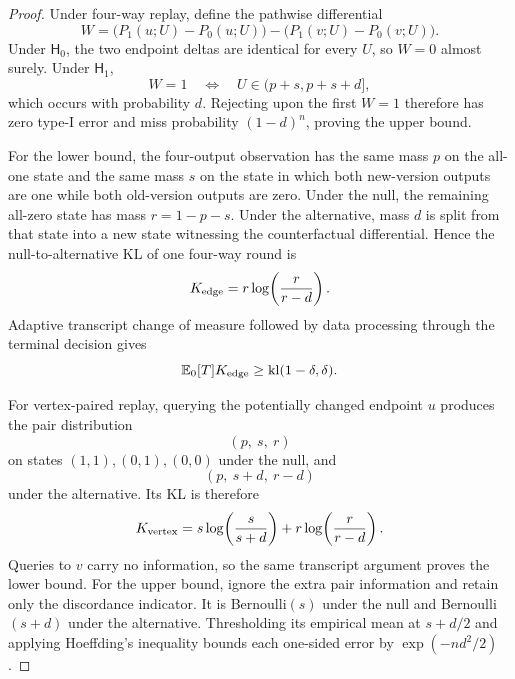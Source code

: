 \begin{proof}
Under four-way replay, define the pathwise differential
\begin{equation}\label{eq:formal-results-024}
W
=
\bigl(P_1(u;U)-P_0(u;U)\bigr)
-
\bigl(P_1(v;U)-P_0(v;U)\bigr).
\end{equation}
Under \(\mathsf H_0\), the two endpoint deltas are identical for every \(U\), so
\(W=0\) almost surely.  Under \(\mathsf H_1\),
\begin{equation}\label{eq:formal-results-025}
W=1
\quad\Longleftrightarrow\quad
U\in(p+s,p+s+d],
\end{equation}
which occurs with probability \(d\).  Rejecting upon the first \(W=1\) therefore
has zero type-I error and miss probability \((1-d)^n\), proving the upper bound.

For the lower bound, the four-output observation has the same mass \(p\) on the
all-one state and the same mass \(s\) on the state in which both new-version
outputs are one while both old-version outputs are zero.  Under the null, the
remaining all-zero state has mass \(r=1-p-s\).  Under the alternative, mass \(d\)
is split from that state into a new state witnessing the counterfactual
differential.  Hence the null-to-alternative KL of one four-way round is
\begin{equation}\label{eq:formal-results-026}
K_{\rm edge}
=
r\log\!\left(\frac{r}{r-d}\right).
\end{equation}
Adaptive transcript change of measure followed by data processing through the
terminal decision gives
\begin{equation}\label{eq:formal-results-027}
\mathbb{E}_0[T]K_{\rm edge}
\ge
\mathrm{kl}(1-\delta,\delta).
\end{equation}

For vertex-paired replay, querying the potentially changed endpoint \(u\) produces
the pair distribution
\begin{equation}\label{eq:formal-results-028}
(p,\ s,\ r)
\end{equation}
on states \((1,1),(0,1),(0,0)\) under the null, and
\begin{equation}\label{eq:formal-results-029}
(p,\ s+d,\ r-d)
\end{equation}
under the alternative.  Its KL is therefore
\begin{equation}\label{eq:formal-results-030}
K_{\rm vertex}
=
s\log\!\left(\frac{s}{s+d}\right)
+
r\log\!\left(\frac{r}{r-d}\right).
\end{equation}
Queries to \(v\) carry no information, so the same transcript argument proves the
lower bound.  For the upper bound, ignore the extra pair information and retain
only the discordance indicator.  It is Bernoulli\((s)\) under the null and
Bernoulli\((s+d)\) under the alternative.  Thresholding its empirical mean at
\(s+d/2\) and applying Hoeffding's inequality bounds each one-sided error by
\(\exp(-nd^2/2)\).


\end{proof}
